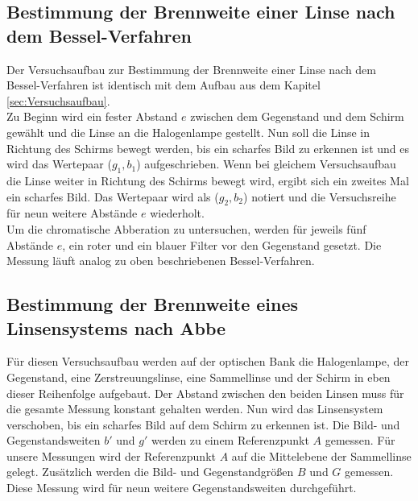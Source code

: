 \subsection{Bestimmung der Brennweite einer Linse nach dem Bessel-Verfahren}
Der Versuchsaufbau zur Bestimmung der Brennweite einer Linse nach dem Bessel-Verfahren ist identisch mit dem Aufbau aus dem Kapitel \eqref{sec:Versuchsaufbau}. \\
Zu Beginn wird ein fester Abstand $e$ zwischen dem Gegenstand und dem Schirm gewählt und die Linse an die Halogenlampe gestellt. Nun soll die Linse in Richtung des Schirms bewegt werden, bis ein scharfes Bild zu erkennen ist und es wird das Wertepaar ($g_1, b_1$) aufgeschrieben. Wenn bei gleichem Versuchsaufbau die Linse weiter in Richtung des Schirms bewegt wird, ergibt sich ein zweites Mal ein scharfes Bild. Das Wertepaar wird als ($g_2, b_2$) notiert und die Versuchsreihe für neun weitere Abstände $e$ wiederholt. \\
Um die chromatische Abberation zu untersuchen, werden für jeweils fünf Abstände $e$, ein roter und ein blauer Filter vor den Gegenstand gesetzt. Die Messung läuft analog zu oben beschriebenen Bessel-Verfahren.

\subsection{Bestimmung der Brennweite eines Linsensystems nach Abbe}
Für diesen Versuchsaufbau werden auf der optischen Bank die Halogenlampe, der Gegenstand, eine Zerstreuungslinse, eine Sammellinse und der Schirm in eben dieser Reihenfolge aufgebaut. Der Abstand zwischen den beiden Linsen muss für die gesamte Messung konstant gehalten werden. Nun wird das Linsensystem verschoben, bis ein scharfes Bild auf dem Schirm zu erkennen ist. Die Bild- und Gegenstandsweiten $b'$ und $g'$ werden zu einem Referenzpunkt $A$ gemessen. Für unsere Messungen wird der Referenzpunkt $A$ auf die Mittelebene der Sammellinse gelegt. Zusätzlich werden die Bild- und Gegenstandgrößen $B$ und $G$ gemessen. Diese Messung wird für neun weitere Gegenstandsweiten durchgeführt.
